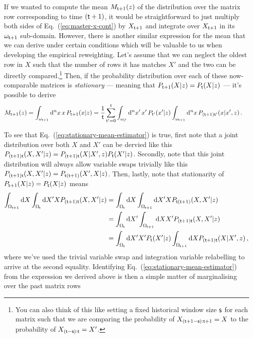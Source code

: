 If we wanted to compute the mean $M_{{\sf t}+1}(z)$ of the distribution over the matrix row corresponding to time $({\sf t}+1)$, it would be straightforward to just multiply both sides of Eq.~(\ref{eq:master-x-cont}) by $X_{{\sf t}+1}$ and integrate over $X_{{\sf t}+1}$ in its $\omega_{{\sf t}+1}$ sub-domain. However, there is another similar expression for the mean that we can derive under certain conditions which will be valuable to us when developing the empirical reweighting. Let's assume that we can neglect the oldest row in $X$ such that the number of rows it has matches $X'$ and the two can be directly compared.\footnote{You can also think of this like setting a fixed historical window size ${\sf s}$ for each matrix such that we are comparing the probability of $X_{({\sf t}+1-{\sf s}):{\sf t}+1}=X$ to the probability of $X_{({\sf t}-{\sf s}):{\sf t}}=X'$.} Then, if the probability distribution over each of these now-comparable matrices is \emph{stationary} --- meaning that $P_{{\sf t}+1}(X\vert z)=P_{{\sf t}}(X\vert z)$ --- it's possible to derive
\begin{align}
M_{{\sf t}+1}(z) &= \int_{\omega_{{\sf t}+1}}{\rm d}^nx \,x\,P_{{\sf t}+1}(x\vert z) = \frac{1}{{\sf t}}\sum_{{\sf t}'=0}^{{\sf t}}\int_{\omega_{{\sf t}'}}{\rm d}^nx' \,x'\, P_{{\sf t}'}(x'\vert z) \int_{\omega_{{\sf t}+1}}{\rm d}^nx\, P_{({\sf t}+1){\sf t}'}(x\vert x',z) \label{eq:stationary-mean-estimator}\,.
\end{align}

To see that Eq.~(\ref{eq:stationary-mean-estimator}) is true, first note that a joint distribution over both $X$ and $X'$ can be dervied like this $P_{({\sf t}+1){\sf t}}(X,X'\vert z)=P_{({\sf t}+1){\sf t}}(X\vert X',z)P_{{\sf t}}(X'\vert z)$. Secondly, note that this joint distribution will always allow variable swaps trivially like this $P_{({\sf t}+1){\sf t}}(X,X'\vert z)=P_{{\sf t}({\sf t}+1)}(X',X\vert z)$. Then, lastly, note that stationarity of $P_{{\sf t}+1}(X\vert z)=P_{{\sf t}}(X\vert z)$ means 
\begin{align}
\int_{\Omega_{{\sf t}+1}} {\rm d}X\int_{\Omega_{{\sf t}}} {\rm d}X' X P_{({\sf t}+1){\sf t}}(X,X'\vert z)&=\int_{\Omega_{{\sf t}}} {\rm d}X\int_{\Omega_{{\sf t}+1}} {\rm d}X'  X P_{{\sf t}({\sf t}+1)}(X,X'\vert z)\nonumber \\
&=\int_{\Omega_{{\sf t}}} {\rm d}X'\int_{\Omega_{{\sf t}+1}} {\rm d}X X' P_{({\sf t}+1){\sf t}}(X,X'\vert z) \nonumber \\
&=\int_{\Omega_{{\sf t}}} {\rm d}X' X' P_{{\sf t}}(X'\vert z)\int_{\Omega_{{\sf t}+1}} {\rm d}X P_{({\sf t}+1){\sf t}}(X\vert X', z) \nonumber \,,
\end{align}
where we've used the trivial variable swap and integration variable relabelling to arrive at the second equality. Identifying Eq.~(\ref{eq:stationary-mean-estimator}) from the expression we derived above is then a simple matter of marginalising over the past matrix rows 

